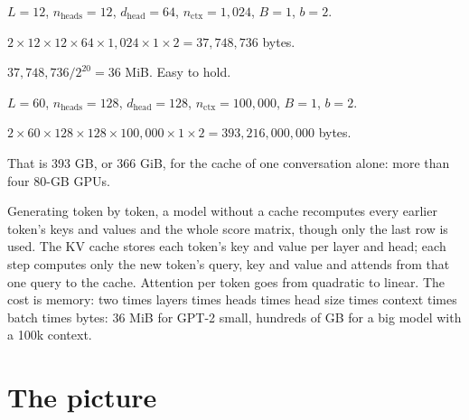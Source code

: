 \begin{example}
$L = 12$, $n_{\text{heads}} = 12$, $d_{\text{head}} = 64$, $n_{\text{ctx}} = 1{,}024$, $B = 1$, $b = 2$.
\begin{steps}
  \item $2 \times 12 \times 12 \times 64 \times 1{,}024 \times 1 \times 2 = 37{,}748{,}736$ bytes.
  \item $37{,}748{,}736 / 2^{20} = 36$ MiB. Easy to hold.
\end{steps}
\end{example}

\begin{example}
$L = 60$, $n_{\text{heads}} = 128$, $d_{\text{head}} = 128$, $n_{\text{ctx}} = 100{,}000$, $B = 1$, $b = 2$.
\begin{steps}
  \item $2 \times 60 \times 128 \times 128 \times 100{,}000 \times 1 \times 2 = 393{,}216{,}000{,}000$ bytes.
  \item That is 393 GB, or $366$ GiB, for the cache of one conversation alone: more than four 80-GB GPUs.
\end{steps}
\end{example}

\begin{sayit}
Generating token by token, a model without a cache recomputes every earlier token's keys and values and the whole score matrix, though only the last row is used. The KV cache stores each token's key and value per layer and head; each step computes only the new token's query, key and value and attends from that one query to the cache. Attention per token goes from quadratic to linear. The cost is memory: two times layers times heads times head size times context times batch times bytes: 36 MiB for GPT-2 small, hundreds of GB for a big model with a 100k context.
\end{sayit}

\section{The picture}

